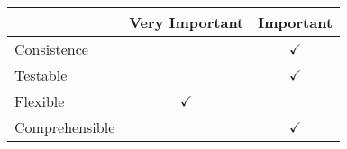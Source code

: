 \begin{frame}
\tiny
\begin{figure}[]
		\begin{tabular}{| l | m{} | m{}|} \hline
 & Very Important&Important \\ \hline
Consistence  				&& \multicolumn{1}{c|}{$\checkmark$} 		\\ \hline
Testable  					&& \multicolumn{1}{c|}{$\checkmark$} 		\\ \hline
Flexible  					& \multicolumn{1}{c|}{$\checkmark$}& 		\\ \hline
Comprehensible  		&& \multicolumn{1}{c|}{$\checkmark$} 		\\ \hline
		\end{tabular}
	\label{fig:prioritizedCrit}
\end{figure}

\end{frame}